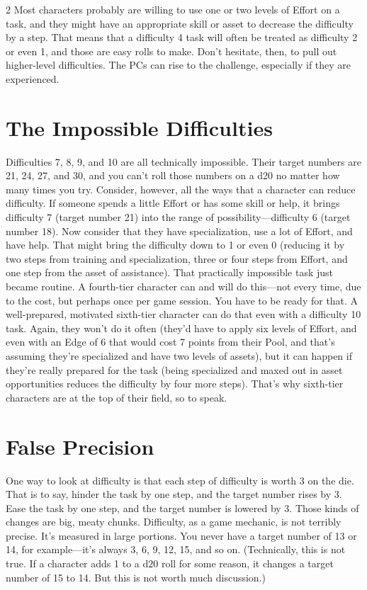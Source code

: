 \begin{multicols}{2}
Most characters probably are willing to use one or two levels of Effort on a task, and they might have an appropriate skill or asset to decrease the difficulty by a step. That means that a difficulty 4 task will often be treated as difficulty 2 or even 1, and those are easy rolls to make. Don’t hesitate, then, to pull out higher-level difficulties. The PCs can rise to the challenge, especially if they are experienced.

\section{The Impossible Difficulties}

Difficulties 7, 8, 9, and 10 are all technically impossible. Their target numbers are 21, 24, 27, and 30, and you can’t roll those numbers on a d20 no matter how many times you try. Consider, however, all the ways that a character can reduce difficulty. If someone spends a little Effort or has some skill or help, it brings difficulty 7 (target number 21) into the range of possibility—difficulty 6 (target number 18). Now consider that they have specialization, use a lot of Effort, and have help. That might bring the difficulty down to 1 or even 0 (reducing it by two steps from training and specialization, three or four steps from Effort, and one step from the asset of assistance). That practically impossible task just became routine. A fourth-tier character can and will do this—not every time, due to the cost, but perhaps once per game session. You have to be ready for that. A well-prepared, motivated sixth-tier character can do that even with a difficulty 10 task. Again, they won’t do it often (they’d have to apply six levels of Effort, and even with an Edge of 6 that would cost 7 points from their Pool, and that’s assuming they’re specialized and have two levels of assets), but it can happen if  they’re really prepared for the task (being specialized and maxed out in asset opportunities reduces the difficulty by four more steps). That’s why sixth-tier characters are at the top of their field, so to speak.

\section{False Precision}

One way to look at difficulty is that each step of difficulty is worth 3 on the die. That is to say, hinder the task by one step, and the target number rises by 3. Ease the task by one step, and the target number is lowered by 3. Those kinds of changes are big, meaty chunks. Difficulty, as a game mechanic, is not terribly precise. It’s measured in large portions. You never have a target number of 13 or 14, for example—it’s always 3, 6, 9, 12, 15, and so on. (Technically, this is not true. If a character adds 1 to a d20 roll for some reason, it changes a target number of 15 to 14. But this is not worth much discussion.)


\end{multicols}
